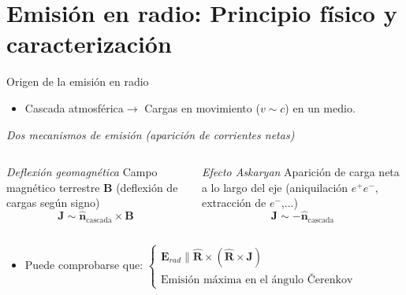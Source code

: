 \documentclass{beamer}
\newcommand{\vect}[1]{\boldsymbol{\mathbf{#1}}}
\begin{document}
	\section{Emisión en radio: Principio físico y caracterización}
	\begin{frame}{Origen de la emisión en radio}
		\begin{itemize}
			\item Cascada atmosférica$\rightarrow$ Cargas en movimiento ($v\sim c$) en un medio.
		\end{itemize}
	\pause\begin{block}{}
		\centering\textit{Dos mecanismos de emisión (aparición de corrientes netas)}
	\end{block}
	\begin{columns}
		\begin{block}{\centering\textit{Deflexión geomagnética}}
			\centering Campo magnético terrestre $\vect{B}$ (deflexión de cargas según signo)
			$$\vect{J}\sim \hat{\vect{n}}_{\text{cascada}}\times\vect{B}$$
		\end{block}
		\begin{block}{\centering\textit{Efecto Askaryan}}
			\centering Aparición de carga neta a lo largo del eje (aniquilación $e^+e^-$, extracción de $e^-$,...)
			$$\vect{J}\sim-\hat{\vect{n}}_{\text{cascada}}$$
		\end{block}
	\end{columns}
\begin{itemize}
	\pause\item Puede comprobarse que: $\left\{\begin{array}{l}\vect{E}_{rad}\parallel\hat{\vect{R}}\times\left(\hat{\vect{R}}\times\vect{J}\right)\\\text{Emisión máxima en el ángulo \v{C}erenkov} \end{array}\right.$
\end{itemize}
	\end{frame}
\end{document}
